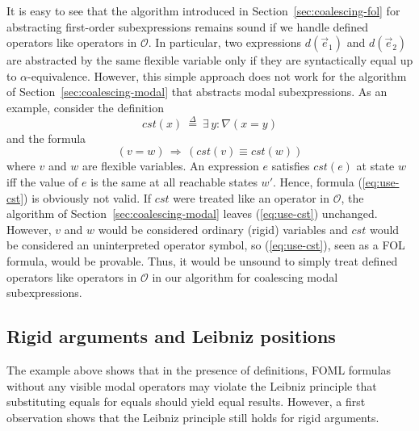 \documentclass{easychair}
\renewcommand{\implies}{\Rightarrow}
\newcommand{\modal}{\nabla}
\newcommand{\OO}{\mathcal{O}}
\newcommand{\edmargin}[2]{\marginpar{\raggedright\footnotesize\color{red}#1: #2}}
\newcommand{\edmargin}[2]{}
\def\llmargin{\edmargin{LL}}
\def\smmargin{\edmargin{SM}}
\def\ddmargin{\edmargin{DD}}
\newcommand{\deq}{\mathrel{\stackrel{\scriptscriptstyle\Delta}{=}}}
\def\E{\exists\,}
\begin{document}
It is easy
to see that the algorithm introduced in
Section~\ref{sec:coalescing-fol} for abstracting first-order subexpressions
remains sound if we handle defined operators like operators in $\OO$.
In particular, two expressions $d(\vec{e}_1)$ and $d(\vec{e}_2)$
are abstracted by the same flexible variable only if they are syntactically
equal up to $\alpha$-equivalence.
%
However, this simple approach does not work for
the algorithm of Section~\ref{sec:coalescing-modal} that abstracts
modal subexpressions. As an example, consider the
definition
%
\begin{equation}\label{eq:def-cst}
  cst(x)\ \deq\ \E y: \modal(x=y)
\end{equation}
%
and the formula
\begin{equation}\label{eq:use-cst}
  (v=w) \,\implies\, (cst(v) \equiv cst(w))
\end{equation}
where $v$ and $w$ are flexible variables.  An expression $e$ satisfies
$cst(e)$ at state $w$ iff the value of $e$ is the same at all
reachable states $w'$.  Hence, formula (\ref{eq:use-cst}) is obviously
not valid.  If $cst$ were treated like an operator in $\OO$, the
algorithm of Section~\ref{sec:coalescing-modal} leaves
(\ref{eq:use-cst}) unchanged.  However, $v$ and $w$ would be
considered ordinary (rigid) variables and $cst$ would be considered an
uninterpreted operator symbol, so (\ref{eq:use-cst}), seen as a FOL
 formula, would be
provable.  Thus, it would be unsound to simply treat defined operators
like operators in $\OO$ in our algorithm for coalescing modal
subexpressions.


\subsection{Rigid arguments and Leibniz positions}
\label{sec:leibniz-cases}

The example above shows that in the presence of definitions, FOML formulas
without any
visible modal operators may violate the Leibniz principle that
substituting equals for equals should yield equal results. However, a first
observation shows that the Leibniz principle still holds for rigid arguments.
\end{document}
